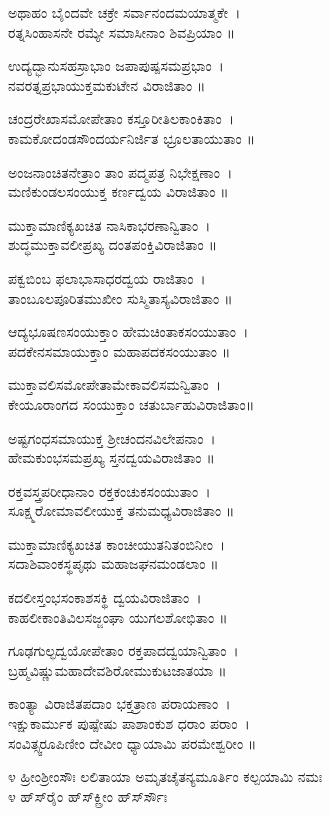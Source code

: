ಅಥಾಹಂ ಬೈಂದವೇ ಚಕ್ರೇ ಸರ್ವಾನಂದಮಯಾತ್ಮಕೇ~।\\
ರತ್ನಸಿಂಹಾಸನೇ ರಮ್ಯೇ ಸಮಾಸೀನಾಂ ಶಿವಪ್ರಿಯಾಂ ॥

ಉದ್ಯದ್ಭಾನುಸಹಸ್ರಾಭಾಂ ಜಪಾಪುಷ್ಪಸಮಪ್ರಭಾಂ~।\\
ನವರತ್ನಪ್ರಭಾಯುಕ್ತಮಕುಟೇನ ವಿರಾಜಿತಾಂ ॥

ಚಂದ್ರರೇಖಾಸಮೋಪೇತಾಂ ಕಸ್ತೂರೀತಿಲಕಾಂಕಿತಾಂ~।\\
ಕಾಮಕೋದಂಡಸೌಂದರ್ಯನಿರ್ಜಿತ ಭ್ರೂಲತಾಯುತಾಂ ॥

ಅಂಜನಾಂಚಿತನೇತ್ರಾಂ ತಾಂ ಪದ್ಮಪತ್ರ ನಿಭೇಕ್ಷಣಾಂ~।\\
ಮಣಿಕುಂಡಲಸಂಯುಕ್ತ ಕರ್ಣದ್ವಯ ವಿರಾಜಿತಾಂ ॥

ಮುಕ್ತಾಮಾಣಿಕ್ಯಖಚಿತ ನಾಸಿಕಾಭರಣಾನ್ವಿತಾಂ~।\\
ಶುದ್ಧಮುಕ್ತಾವಲೀಪ್ರಖ್ಯ ದಂತಪಂಕ್ತಿವಿರಾಜಿತಾಂ ॥

ಪಕ್ವಬಿಂಬ ಫಲಾಭಾಸಾಧರದ್ವಯ ರಾಜಿತಾಂ~।\\
ತಾಂಬೂಲಪೂರಿತಮುಖೀಂ ಸುಸ್ಮಿತಾಸ್ಯವಿರಾಜಿತಾಂ ॥

ಆದ್ಯಭೂಷಣಸಂಯುಕ್ತಾಂ ಹೇಮಚಿಂತಾಕಸಂಯುತಾಂ~।\\
ಪದಕೇನಸಮಾಯುಕ್ತಾಂ ಮಹಾಪದಕಸಂಯುತಾಂ ॥

ಮುಕ್ತಾವಲಿಸಮೋಪೇತಾಮೇಕಾವಲಿಸಮನ್ವಿತಾಂ~।\\
ಕೇಯೂರಾಂಗದ ಸಂಯುಕ್ತಾಂ ಚತುರ್ಬಾಹುವಿರಾಜಿತಾಂ॥

ಅಷ್ಟಗಂಧಸಮಾಯುಕ್ತ ಶ್ರೀಚಂದನವಿಲೇಪನಾಂ~।\\
ಹೇಮಕುಂಭಸಮಪ್ರಖ್ಯ ಸ್ತನದ್ವಯವಿರಾಜಿತಾಂ ॥

ರಕ್ತವಸ್ತ್ರಪರೀಧಾನಾಂ ರಕ್ತಕಂಚುಕಸಂಯುತಾಂ~।\\
ಸೂಕ್ಷ್ಮರೋಮಾವಲೀಯುಕ್ತ ತನುಮಧ್ಯವಿರಾಜಿತಾಂ ॥

ಮುಕ್ತಾಮಾಣಿಕ್ಯಖಚಿತ ಕಾಂಚೀಯುತನಿತಂಬಿನೀಂ~।\\
ಸದಾಶಿವಾಂಕಸ್ಥಪೃಥು ಮಹಾಜಘನಮಂಡಲಾಂ ॥

ಕದಲೀಸ್ತಂಭಸಂಕಾಶಸಕ್ಥಿ ದ್ವಯವಿರಾಜಿತಾಂ~।\\
ಕಾಹಲೀಕಾಂತಿವಿಲಸಜ್ಜಂಘಾ ಯುಗಲಶೋಭಿತಾಂ ॥

ಗೂಢಗುಲ್ಫದ್ವಯೋಪೇತಾಂ ರಕ್ತಪಾದದ್ವಯಾನ್ವಿತಾಂ~।\\
ಬ್ರಹ್ಮವಿಷ್ಣುಮಹಾದೇವಶಿರೋಮುಕುಟಜಾತಯಾ ॥

ಕಾಂತ್ಯಾ ವಿರಾಜಿತಪದಾಂ ಭಕ್ತತ್ರಾಣ ಪರಾಯಣಾಂ~।\\
ಇಕ್ಷುಕಾರ್ಮುಕ ಪುಷ್ಪೇಷು ಪಾಶಾಂಕುಶ ಧರಾಂ ಪರಾಂ~।\\
ಸಂವಿತ್ಸ್ವರೂಪಿಣೀಂ ದೇವೀಂ ಧ್ಯಾಯಾಮಿ ಪರಮೇಶ್ವರೀಂ ॥

೪ ಹ್ರೀಂಶ್ರೀಂಸೌಃ ಲಲಿತಾಯಾ ಅಮೃತಚೈತನ್ಯಮೂರ್ತಿಂ ಕಲ್ಪಯಾಮಿ ನಮಃ\\
೪ ಹ್‌ಸ್‌ರೈಂ ಹ್‌ಸ್‌ಕ್ಲ್ರೀಂ ಹ್‌ಸ್‌ರ್ಸೌಃ\\

